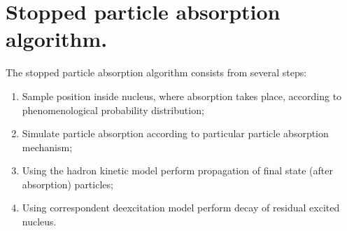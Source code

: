 \section{Stopped particle absorption algorithm.}

 The stopped particle absorption algorithm consists 
 from several steps:
\begin{enumerate}
\item Sample position inside nucleus, where absorption takes place,
according to phenomenological probability distribution;
\item Simulate particle absorption according to particular particle absorption 
mechanism;
\item Using the hadron kinetic model perform propagation of final state 
(after absorption) particles;
\item Using correspondent deexcitation 
model perform decay of residual excited nucleus.
\end{enumerate}

